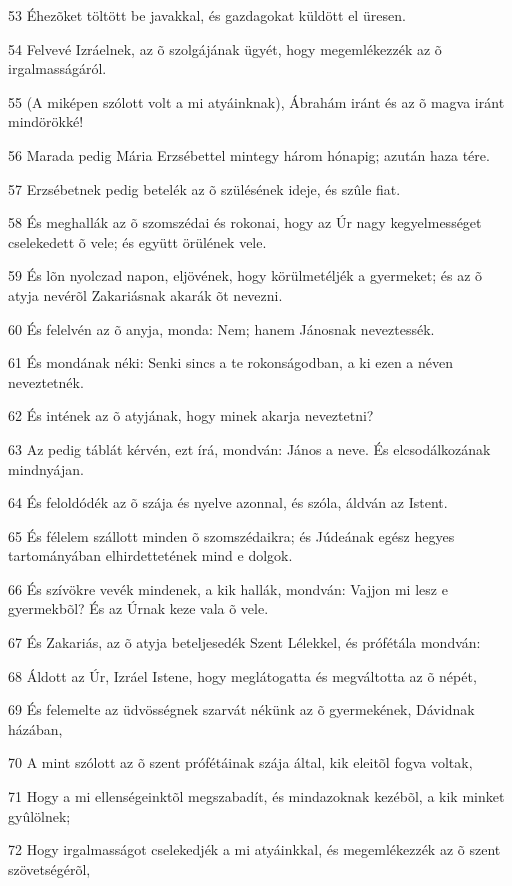 \par 53 Éhezõket töltött be javakkal, és gazdagokat küldött el üresen.
\par 54 Felvevé Izráelnek, az õ szolgájának ügyét, hogy megemlékezzék az õ irgalmasságáról.
\par 55 (A miképen szólott volt a mi atyáinknak), Ábrahám iránt és az õ magva iránt mindörökké!
\par 56 Marada pedig Mária Erzsébettel mintegy három hónapig; azután haza tére.
\par 57 Erzsébetnek pedig betelék az õ szülésének ideje, és szûle fiat.
\par 58 És meghallák az õ szomszédai és rokonai, hogy az Úr nagy kegyelmességet cselekedett õ vele; és együtt örülének vele.
\par 59 És lõn nyolczad napon, eljövének, hogy körülmetéljék a gyermeket; és az õ atyja nevérõl Zakariásnak akarák õt nevezni.
\par 60 És felelvén az õ anyja, monda: Nem; hanem Jánosnak neveztessék.
\par 61 És mondának néki: Senki sincs a te rokonságodban, a ki ezen a néven neveztetnék.
\par 62 És intének az õ atyjának, hogy minek akarja neveztetni?
\par 63 Az pedig táblát kérvén, ezt írá, mondván: János a neve. És elcsodálkozának mindnyájan.
\par 64 És feloldódék az õ szája és nyelve azonnal, és szóla, áldván az Istent.
\par 65 És félelem szállott minden õ szomszédaikra; és Júdeának egész hegyes tartományában elhirdettetének mind e dolgok.
\par 66 És szívökre vevék mindenek, a kik hallák, mondván: Vajjon mi lesz e gyermekbõl? És az Úrnak keze vala õ vele.
\par 67 És Zakariás, az õ atyja beteljesedék Szent Lélekkel, és prófétála mondván:
\par 68 Áldott az Úr, Izráel Istene, hogy meglátogatta és megváltotta az õ népét,
\par 69 És felemelte az üdvösségnek szarvát nékünk az õ gyermekének, Dávidnak házában,
\par 70 A mint szólott az õ szent prófétáinak szája által, kik eleitõl fogva voltak,
\par 71 Hogy a mi ellenségeinktõl megszabadít, és mindazoknak kezébõl, a kik minket gyûlölnek;
\par 72 Hogy irgalmasságot cselekedjék a mi atyáinkkal, és megemlékezzék az õ szent szövetségérõl,
